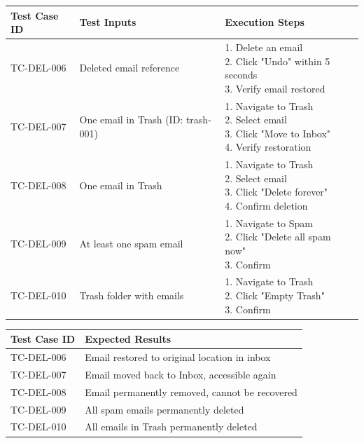 \documentclass[12pt,a4paper]{article}
\begin{document}
\begin{table}[h!]
\centering
\begin{tabular}{|p{3cm}|p{5cm}|p{7cm}|}
\hline
\textbf{Test Case ID} & \textbf{Test Inputs} & \textbf{Execution Steps} \\
\hline
TC-DEL-006 & Deleted email reference & \parbox{5cm}{1. Delete an email\\2. Click "Undo" within 5 seconds\\3. Verify email restored} \\
\hline
TC-DEL-007 & One email in Trash (ID: trash-001) & \parbox{5cm}{1. Navigate to Trash\\2. Select email\\3. Click "Move to Inbox"\\4. Verify restoration} \\
\hline
TC-DEL-008 & One email in Trash & \parbox{5cm}{1. Navigate to Trash\\2. Select email\\3. Click "Delete forever"\\4. Confirm deletion} \\
\hline
TC-DEL-009 & At least one spam email & \parbox{5cm}{1. Navigate to Spam\\2. Click "Delete all spam now"\\3. Confirm} \\
\hline
TC-DEL-010 & Trash folder with emails & \parbox{5cm}{1. Navigate to Trash\\2. Click "Empty Trash"\\3. Confirm} \\
\hline
\end{tabular}
\end{table}

\begin{table}[h!]
\centering
\begin{tabular}{|p{3cm}|p{7cm}|}
\hline
\textbf{Test Case ID} & \textbf{Expected Results} \\
\hline
TC-DEL-006 & Email restored to original location in inbox \\
\hline
TC-DEL-007 & Email moved back to Inbox, accessible again \\
\hline
TC-DEL-008 & Email permanently removed, cannot be recovered \\
\hline
TC-DEL-009 & All spam emails permanently deleted \\
\hline
TC-DEL-010 & All emails in Trash permanently deleted \\
\hline
\end{tabular}
\end{table}
\end{document}
